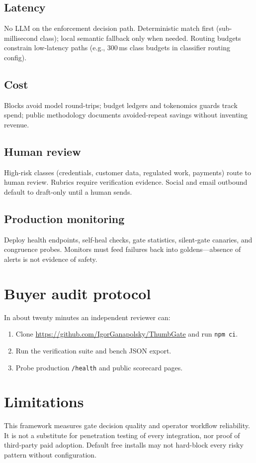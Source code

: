 \documentclass[11pt]{article}
\begin{document}
\subsection{Latency}
No LLM on the enforcement decision path. Deterministic match first (sub-millisecond class); local semantic fallback only when needed. Routing budgets constrain low-latency paths (e.g., 300\,ms class budgets in classifier routing config).

\subsection{Cost}
Blocks avoid model round-trips; budget ledgers and tokenomics guards track spend; public methodology documents avoided-repeat savings without inventing revenue.

\subsection{Human review}
High-risk classes (credentials, customer data, regulated work, payments) route to human review. Rubrics require verification evidence. Social and email outbound default to draft-only until a human sends.

\subsection{Production monitoring}
Deploy health endpoints, self-heal checks, gate statistics, silent-gate canaries, and congruence probes. Monitors must feed failures back into goldens---absence of alerts is not evidence of safety.

\section{Buyer audit protocol}
In about twenty minutes an independent reviewer can:
\begin{enumerate}[leftmargin=*]
  \item Clone \url{https://github.com/IgorGanapolsky/ThumbGate} and run \texttt{npm ci}.
  \item Run the verification suite and bench JSON export.
  \item Probe production \texttt{/health} and public scorecard pages.
\end{enumerate}

\section{Limitations}
This framework measures gate decision quality and operator workflow reliability. It is not a substitute for penetration testing of every integration, nor proof of third-party paid adoption. Default free installs may not hard-block every risky pattern without configuration.
\end{document}
